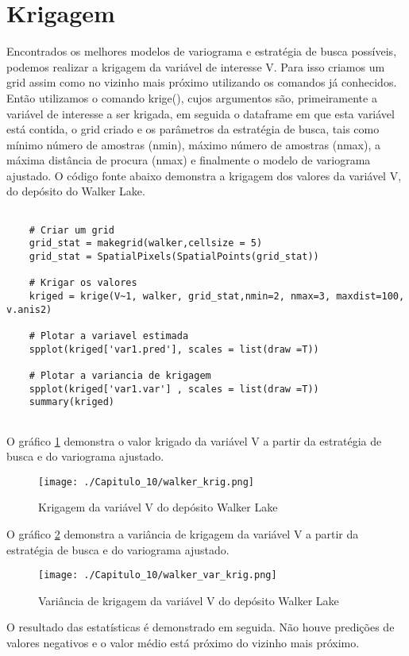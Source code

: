 \section{Krigagem} 

Encontrados os melhores modelos de variograma e estratégia de busca possíveis, podemos realizar a krigagem da variável de interesse V. Para isso criamos um grid assim como no vizinho mais próximo utilizando os comandos já conhecidos. Então utilizamos o comando krige(), cujos argumentos são, primeiramente a variável de interesse a ser krigada, em seguida o dataframe em que esta variável está contida, o grid criado e os parâmetros da estratégia de busca, tais como mínimo número de amostras (nmin), máximo número de amostras (nmax), a máxima distância de procura (nmax) e finalmente o modelo de variograma ajustado. O código fonte abaixo demonstra a krigagem dos valores da variável V, do depósito do Walker Lake. 


\begin{scriptsize}
	\estiloR
	\begin{lstlisting}[]
	
	# Criar um grid 
	grid_stat = makegrid(walker,cellsize = 5)
	grid_stat = SpatialPixels(SpatialPoints(grid_stat))
		
	# Krigar os valores
	kriged = krige(V~1, walker, grid_stat,nmin=2, nmax=3, maxdist=100, v.anis2)
	
	# Plotar a variavel estimada
	spplot(kriged['var1.pred'], scales = list(draw =T))
	
	# Plotar a variancia de krigagem
	spplot(kriged['var1.var'] , scales = list(draw =T))
	summary(kriged)
	
	\end{lstlisting}
\end{scriptsize}

O gráfico \ref{krig_walk_2} demonstra o valor krigado da variável V a partir da estratégia de busca e do variograma ajustado.

\FloatBarrier
\begin{figure}[H]
	\centering
	\texttt{[image: ./Capitulo\_10/walker\_krig.png]}	
	\caption{Krigagem da variável V do depósito Walker Lake}
	\label{krig_walk_2}
\end{figure}
\FloatBarrier

O gráfico \ref{krig_walk} demonstra a variância de krigagem da variável V a partir da estratégia de busca e do variograma ajustado.

\FloatBarrier
\begin{figure}[H]
	\centering
	\texttt{[image: ./Capitulo\_10/walker\_var\_krig.png]}	
	\caption{ Variância de krigagem da variável V do depósito Walker Lake}
	\label{krig_walk}
\end{figure}
\FloatBarrier

O resultado das estatísticas é demonstrado em seguida. Não houve predições de valores negativos e o valor médio está próximo do vizinho mais próximo. 

\begingroup
{}

\endgroup
